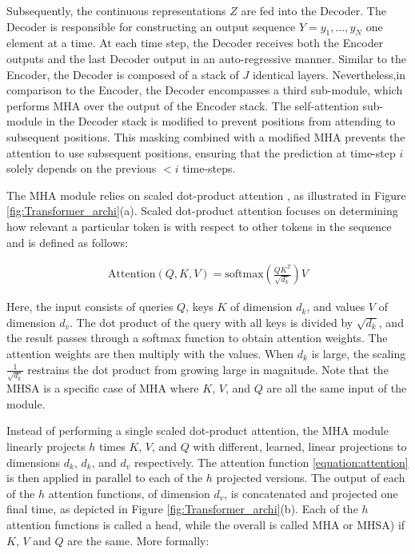 Subsequently, the continuous representations $Z$ are fed into the Decoder. The Decoder is responsible for constructing an output sequence $Y = y_1, \dots, y_N$ one element at a time. At each time step, the Decoder receives both the Encoder outputs and the last Decoder output in an auto-regressive manner. Similar to the Encoder, the Decoder is composed of a stack of $J$ identical layers. Nevertheless,in comparison to the Encoder, the Decoder encompasses a third sub-module, which performs \ac{MHA} over the output of the Encoder stack. The self-attention sub-module in the Decoder stack is modified to prevent positions from attending to subsequent positions. This masking combined with a modified \ac{MHA} prevents the attention to use subsequent positions, ensuring that the prediction at time-step $i$ solely depends on the previous $< i$ time-steps.

The \ac{MHA} module relies on scaled dot-product attention \cite{vaswani2017attention}, as illustrated in Figure \ref{fig:Transformer_archi}(a). Scaled dot-product attention focuses on determining how relevant a particular token is with respect to other tokens in the sequence and is defined as follows:

\begin{align}
\text{Attention}(Q, K, V) = \text{softmax}\left(\frac{QK^T}{\sqrt{d_k}}\right)V
\label{equation:attention}
\end{align}


Here, the input consists of queries $Q$, keys $K$ of dimension $d_k$, and values $V$ of dimension $d_v$. The dot product of the query with all keys is divided by $\sqrt{d_k}$, and the result passes through a softmax function to obtain attention weights. The attention weights are then multiply with the values. When $d_k$ is large, the scaling  $\frac{1}{\sqrt{d_k}}$ restrains the dot product from growing large in magnitude. Note that the \ac{MHSA} is a specific case of \ac{MHA} where $K$, $V$, and $Q$ are all the same input of the module.

Instead of performing a single scaled dot-product attention, the \ac{MHA} module linearly projects $h$ times $K$, $V$, and $Q$ with different, learned, linear projections to dimensions $d_k$, $d_k$, and $d_v$ respectively. The attention function \ref{equation:attention} is then applied in parallel to each of the $h$ projected versions. The output of each of the $h$ attention functions, of dimension $d_v$, is concatenated and projected one final time, as depicted in Figure \ref{fig:Transformer_archi}(b). Each of the $h$ attention functions is called a head, while the overall is called \ac{MHA} or \ac{MHSA}) if $K$, $V$ and $Q$ are the same. More formally:

